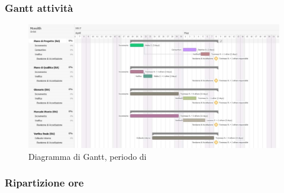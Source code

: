 \subsubsection{Gantt attività}
\begin{figure}[H]
	\centering
	\includegraphics[width=15cm]{gantt/Gantt_RA2.png}
	\caption{Diagramma di Gantt, periodo di \VV{}}
\end{figure}

\subsubsection{Ripartizione ore}
\bgroup
\egroup


